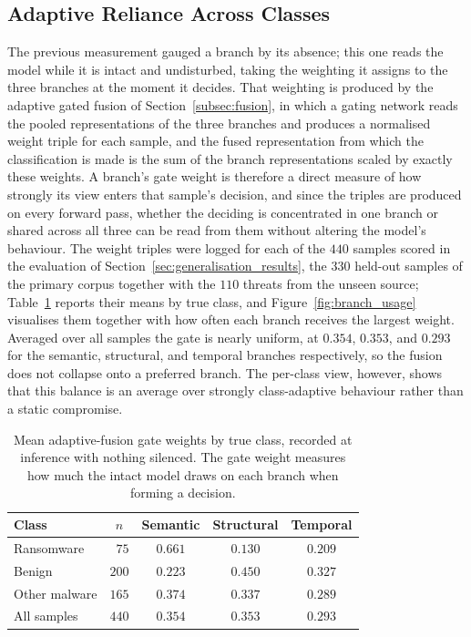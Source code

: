 \documentclass[%
    BCOR=10mm,
    DIV=13,
    toc=bibliography,
    toc=listof,
    oneside,
    12pt,
]{scrbook}
\begin{document}
\subsection{Adaptive Reliance Across Classes}
\label{subsec:branch_specialisation}

The previous measurement gauged a branch by its absence; this one reads the
model while it is intact and undisturbed, taking the weighting it assigns to
the three branches at the moment it decides. That weighting is produced by the
adaptive gated fusion of Section~\ref{subsec:fusion}, in which a gating network
reads the pooled representations of the three branches and produces a
normalised weight triple for each sample, and the fused representation from
which the classification is made is the sum of the branch representations
scaled by exactly these weights. A branch's gate weight is therefore a direct
measure of how strongly its view enters that sample's decision, and since the
triples are produced on every forward pass, whether the deciding is
concentrated in one branch or shared across all three can be read from them
without altering the model's behaviour. The weight triples were logged for each
of the $440$ samples scored in the evaluation of
Section~\ref{sec:generalisation_results}, the $330$ held-out samples of the
primary corpus together with the $110$ threats from the unseen source;
Table~\ref{tab:gate_weights} reports their means by true class, and
Figure~\ref{fig:branch_usage} visualises them together with how often each
branch receives the largest weight. Averaged over all samples the gate is
nearly uniform, at $0.354$, $0.353$, and $0.293$ for the semantic, structural,
and temporal branches respectively, so the fusion does not collapse onto a
preferred branch. The per-class view, however, shows that this balance is an
average over strongly class-adaptive behaviour rather than a static compromise.

\begin{table}[htbp]
\centering
\caption[Mean gate weights by true class]{Mean adaptive-fusion gate weights by true class, recorded at inference
with nothing silenced. The gate weight measures how much the intact model draws
on each branch when forming a decision.}
\label{tab:gate_weights}
\begin{tabular}{l r ccc}
\toprule
\textbf{Class} & \multicolumn{1}{c}{$n$} & \textbf{Semantic} & \textbf{Structural} & \textbf{Temporal} \\
\midrule
Ransomware    & $75$  & $0.661$ & $0.130$ & $0.209$ \\
Benign        & $200$ & $0.223$ & $0.450$ & $0.327$ \\
Other malware & $165$ & $0.374$ & $0.337$ & $0.289$ \\
\midrule
All samples   & $440$ & $0.354$ & $0.353$ & $0.293$ \\
\bottomrule
\end{tabular}
\end{table}
\end{document}
